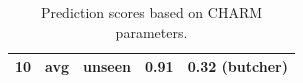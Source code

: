 \begin{table}[]
\begin{adjustbox}{width=0.75\textwidth}
\begin{tabular}{ccc|cl}
10                                                            & avg                                                             & \textbf{unseen}                                                & 0.91                                                                & 0.32 (butcher) \\                      \bottomrule                                  
\end{tabular}
\end{adjustbox}
    \caption{Prediction scores based on CHARM parameters.}
    \label{param_change}
\end{table}
